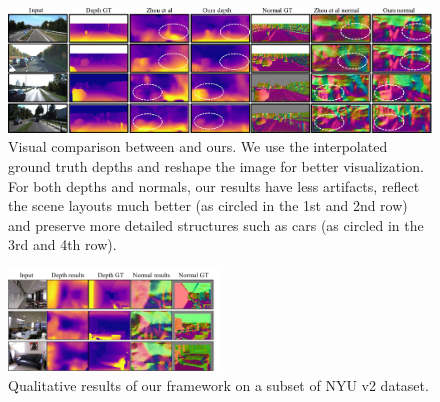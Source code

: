\begin{figure}
\vspace{-0.2\baselineskip}
\centering
\includegraphics[width=\textwidth]{figures/examples_7col_comp-v2.pdf}
\caption{Visual comparison between \protect\cite{zhou2017unsupervised} and ours. We use the interpolated ground truth depths and reshape the image for better visualization. For both depths and normals, our results have less artifacts, reflect the scene layouts much better (as circled in the 1st and 2nd row) and preserve more detailed structures such as cars (as circled in the 3rd and 4th row). }
\vspace{-1.0\baselineskip}
\label{fig:examples}
\end{figure}

\begin{figure}[h]
\centering
\includegraphics[width=0.5\textwidth]{figures/indoor_visual_comp.pdf}
\caption{Qualitative results of our framework on a subset of NYU v2 dataset.}
\vspace{-1.\baselineskip}
\label{fig:nyu_visual}
\end{figure}

